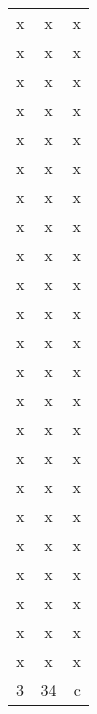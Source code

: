\documentclass{article}
\begin{document}
\begin{longtable}[h!]{l|S|r}
		x & x & x\\
		x & x & x\\
		x & x & x\\
		x & x & x\\
		x & x & x\\
		x & x & x\\
		x & x & x\\
		x & x & x\\
		x & x & x\\
		x & x & x\\
		x & x & x\\
		x & x & x\\
		x & x & x\\
		x & x & x\\
		x & x & x\\
		x & x & x\\
		x & x & x\\
		x & x & x\\
		x & x & x\\
		x & x & x\\
		x & x & x\\
		x & x & x\\
		x & x & x\\
		
		3 & 34 & c\\
		\bottomrule
	\end{longtable}
	
\end{document}
